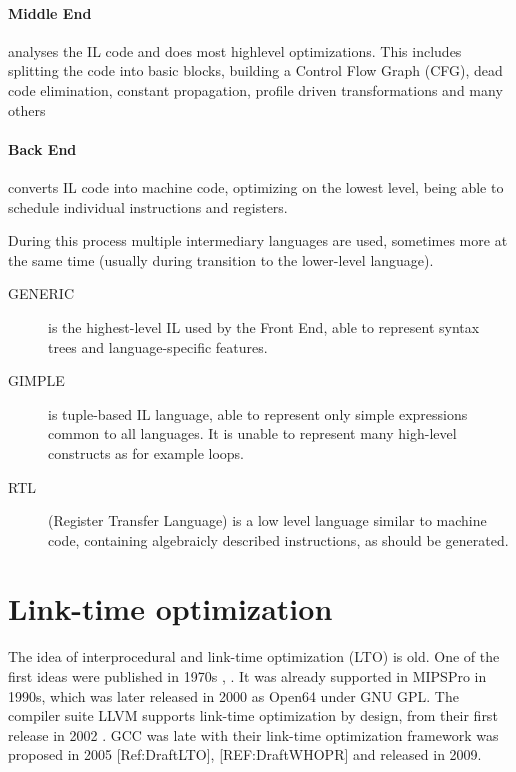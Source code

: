 \paragraph{Middle End} analyses the IL code and does most highlevel
optimizations. This includes splitting the code into basic blocks, building a
Control Flow Graph (CFG), dead code elimination, constant propagation, profile
driven transformations and many others 

\paragraph{Back End} converts IL code into machine code, optimizing on the
lowest level, being able to schedule individual instructions and registers.

During this process multiple intermediary languages are used, sometimes more at
the same time (usually during transition to the lower-level language).

\begin{description}
	\item[GENERIC] is the highest-level IL used by the Front End, able to
		represent syntax trees and language-specific features.
	\item[GIMPLE] is tuple-based IL language, able to represent only simple
		expressions common to all languages. It is unable to represent many
		high-level constructs as for example loops.
	\item[RTL] (Register Transfer Language) is a low level language similar to
		machine code, containing algebraicly described instructions, as should
		be generated.
\end{description}


\section{Link-time optimization}

The idea of interprocedural and link-time optimization (LTO) is old. One of the
first ideas were published in 1970s \cite{Allen1974}, \cite{Allen1976}. It was
already supported in MIPSPro in 1990s, which was later released in 2000 as
Open64 under GNU GPL. The compiler suite LLVM supports link-time optimization by
design, from their first release in 2002 \cite{lattner2002llvm}.  GCC was late
with their link-time optimization framework was proposed in 2005 [Ref:DraftLTO],
[REF:DraftWHOPR] and released in 2009.

